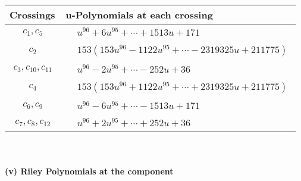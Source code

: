 \documentclass[1p]{elsarticle_modified}
\theoremstyle{definition}
\begin{document}
\begin{tabular}{m{50pt}|m{274pt}}
Crossings & \hspace{64pt}u-Polynomials at each crossing \\
\hline $$\begin{aligned}c_{1},c_{5}\end{aligned}$$&$\begin{aligned}
&u^{96}+6 u^{95}+\cdots+1513 u+171
\end{aligned}$\\
\hline $$\begin{aligned}c_{2}\end{aligned}$$&$\begin{aligned}
&153(153 u^{96}-1122 u^{95}+\cdots-2319325 u+211775)
\end{aligned}$\\
\hline $$\begin{aligned}c_{3},c_{10},c_{11}\end{aligned}$$&$\begin{aligned}
&u^{96}-2 u^{95}+\cdots-252 u+36
\end{aligned}$\\
\hline $$\begin{aligned}c_{4}\end{aligned}$$&$\begin{aligned}
&153(153 u^{96}+1122 u^{95}+\cdots+2319325 u+211775)
\end{aligned}$\\
\hline $$\begin{aligned}c_{6},c_{9}\end{aligned}$$&$\begin{aligned}
&u^{96}-6 u^{95}+\cdots-1513 u+171
\end{aligned}$\\
\hline $$\begin{aligned}c_{7},c_{8},c_{12}\end{aligned}$$&$\begin{aligned}
&u^{96}+2 u^{95}+\cdots+252 u+36
\end{aligned}$\\
\hline
\end{tabular}\\~\\
\newpage\renewcommand{\arraystretch}{1}
\flushleft \textbf{(v) Riley Polynomials at the component}\newline \\
\end{document}
